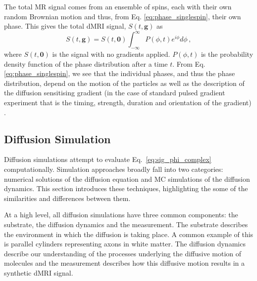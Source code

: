 The total MR signal comes from an ensemble of spins, each with their own random Brownian motion and thus, from  Eq. \ref{eq:phase_singlespin}, their own phase. This gives the total \ac{dMRI} signal, $S(t, \mathbf{g})$ as
\begin{equation}
  S(t, \mathbf{g}) = S(t, \mathbf{0}) \int_{-\infty}^{\infty} P(\phi, t) e^{i\phi} d\phi\,,
  \label{eq:sig_phi_complex}
\end{equation}
where $S(t, \mathbf{0})$ is the signal with no gradients applied. $P(\phi, t)$ is the probability density function of the phase distribution after a time $t$.
From Eq. \ref{eq:phase_singlespin}, we see that the individual phases, and thus the phase distribution, depend on the motion of the particles as well as the description of the diffusion sensitising gradient (in the case of standard pulsed gradient experiment that is the timing, strength, duration and orientation of the gradient) \cite{Price1997}.


\subsection{Diffusion Simulation}
\label{sec:diffusion_simulation}
Diffusion simulations attempt to evaluate Eq.\ \ref{eq:sig_phi_complex} computationally. Simulation approaches broadly fall into two categories: numerical solutions of the diffusion equation and \ac{MC} simulations of the diffusion dynamics. This section introduces these techniques, highlighting the some of the similarities and differences between them. 


At a high level, all diffusion simulations have three common components: the substrate, the diffusion dynamics and the measurement.
The substrate describes the environment in which the diffusion is taking place. A common example of this is parallel cylinders representing axons in white matter.
The diffusion dynamics describe our understanding of the processes underlying the diffusive motion of molecules and the measurement describes how this diffusive motion results in a synthetic \ac{dMRI} signal.

